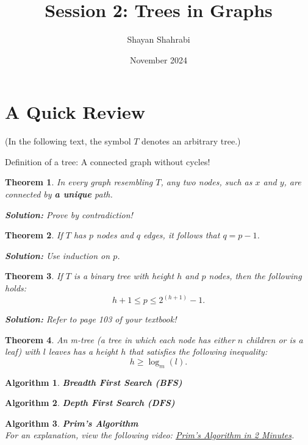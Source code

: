 \documentclass{article}
\title{Session 2: Trees in Graphs}
\author{Shayan Shahrabi}
\date{November 2024}
\newtheorem{theorem}{Theorem}
\newtheorem{algorithm}{Algorithm}
\begin{document}
\maketitle

\section*{A Quick Review}

(In the following text, the symbol $T$ denotes an arbitrary tree.)

Definition of a tree: A connected graph without cycles!

\begin{theorem}
    In every graph resembling $T$, any two nodes, such as $x$ and $y$, are connected by \textbf{a unique} path.
    
    \textbf{Solution:} Prove by contradiction!
\end{theorem}

\begin{theorem}
    If $T$ has $p$ nodes and $q$ edges, it follows that \( q = p - 1 \).
    
    \textbf{Solution:} Use induction on $p$.
\end{theorem}

\begin{theorem}
    If $T$ is a binary tree with height $h$ and $p$ nodes, then the following holds:
    \[
    h + 1 \le p \le 2^{(h + 1)} - 1.
    \]

    \textbf{Solution:} Refer to page 103 of your textbook!
\end{theorem}

\begin{theorem}
    An m-tree (a tree in which each node has either $n$ children or is a leaf) with $l$ leaves has a height $h$ that satisfies the following inequality:
    \[
    h \ge \log_m(l).
    \]
\end{theorem}

\begin{algorithm}
    \textbf{Breadth First Search (BFS)}
\end{algorithm}

\begin{algorithm}
    \textbf{Depth First Search (DFS)} 
\end{algorithm}

\begin{algorithm}
    \textbf{Prim's Algorithm} \\
    For an explanation, view the following video: \href{https://www.youtube.com/watch?v=cplfcGZmX7I&t=2s}{Prim's Algorithm in 2 Minutes}.
\end{algorithm}
\end{document}
